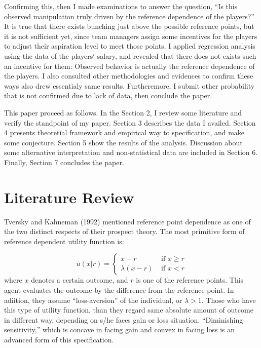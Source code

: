 \documentclass[dvipdfmx, 12pt]{article}
\begin{document}
Confirming this, then I made examinations to answer the question, ``Is this observed manipulation truly driven by the reference dependence of the players?'' It is true that there exists bunching just above the possible reference points, but it is not sufficient yet, since team managers assign some incentives for the players to adjust their aspiration level to meet those points. I applied regression analysis using the data of the players` salary, and revealed that there does not exists such an incentive for them: Observed behavior is actually the reference dependence of the players. I also consulted other methodologies and evidences to confirm these ways also drew essentialy same results. Furtheremore, I submit other probability that is not confirmed due to lack of data, then conclude the paper.

This paper proceed as follows. In the Section 2, I review some literature and verify the standpoint of my paper. Section 3 describes the data I availed. Section 4 presents theoretial framework and empirical way to specification, and make some conjecture.  Section 5 show the results of the analysis. Discussion about some alternative interpretation and non-statistical data are included in Section 6. Finally, Section 7 concludes the paper.

\section{Literature Review}

  Tversky and Kahneman (1992) mentioned reference point dependence as one of the two distinct respects of their prospect theory. The most primitive form of reference dependent utility function is:

   \[
  u(x | r) = \begin{cases}
  x - r & \text{ if }x \geq r \\
  \lambda (x - r) & \text{ if }x < r
\end{cases}
  \]
  where $x$ denotes a certain outcome, and $r$ is one of the reference points. This agent evaluates the outcome by the difference from the reference point. In adiition, they assume ``loss-aversion'' of the individual, or $\lambda > 1$. Those who have this type of utility function, than they regard same absolute amount of outcome in different way, depending on s/he faces gain or loss situation. ``Diminishing sensitivity,'' which is concave in facing gain and convex in facing loss is an advanced form of this specification.
\end{document}
